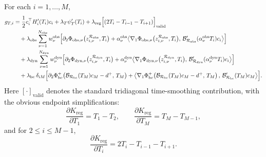 \begin{proposition}
\label{prop:phase10_dKdT}
For each \(i=1,\dots,M\),
\begin{align}
\label{eq:phase10_dKdT}
g_{T,i}
&=
\frac12 c_i^\top H_i'(T_i)c_i
+
\lambda_T \psi_T'(T_i)
+
\lambda_{\mathrm{reg}}
\Bigl[(2T_i-T_{i-1}-T_{i+1})\Bigr]_{\mathrm{valid}}
\notag\\
&\quad
+\lambda_{\mathrm{obs}}
\sum_{\nu=1}^{N_{\mathrm{obs}}}
w_\nu^{\mathrm{obs}}
\Bigl[
\partial_2 \Phi_{\mathrm{obs},\nu}
\bigl(
z_{i,\nu}^{\mathcal R_{\mathrm{obs}}},T_i
\bigr)
+
\alpha_\nu^{\mathrm{obs}}
\bigl\langle
\nabla_1 \Phi_{\mathrm{obs},\nu}
\bigl(
z_{i,\nu}^{\mathcal R_{\mathrm{obs}}},T_i
\bigr),
\,
\mathcal B'_{\mathcal R_{\mathrm{obs}}}(\alpha_\nu^{\mathrm{obs}}T_i)c_i
\bigr\rangle
\Bigr]
\notag\\
&\quad
+\lambda_{\mathrm{dyn}}
\sum_{\nu=1}^{N_{\mathrm{dyn}}}
w_\nu^{\mathrm{dyn}}
\Bigl[
\partial_2 \Phi_{\mathrm{dyn},\nu}
\bigl(
z_{i,\nu}^{\mathcal R_{\mathrm{dyn}}},T_i
\bigr)
+
\alpha_\nu^{\mathrm{dyn}}
\bigl\langle
\nabla_1 \Phi_{\mathrm{dyn},\nu}
\bigl(
z_{i,\nu}^{\mathcal R_{\mathrm{dyn}}},T_i
\bigr),
\,
\mathcal B'_{\mathcal R_{\mathrm{dyn}}}(\alpha_\nu^{\mathrm{dyn}}T_i)c_i
\bigr\rangle
\Bigr]
\notag\\
&\quad
+\lambda_{\mathrm{bc}}\,\delta_{iM}
\Bigl[
\partial_2 \Phi_{\mathrm{bc}}^+
\!\left(
\mathcal B_{\mathcal R_{\mathrm{bc}}}(T_M)c_M-d^+,\,T_M
\right)
+
\bigl\langle
\nabla_1 \Phi_{\mathrm{bc}}^+
\!\left(
\mathcal B_{\mathcal R_{\mathrm{bc}}}(T_M)c_M-d^+,\,T_M
\right),
\,
\mathcal B'_{\mathcal R_{\mathrm{bc}}}(T_M)c_M
\bigr\rangle
\Bigr].
\end{align}
Here \([\cdot]_{\mathrm{valid}}\) denotes the standard tridiagonal time-smoothing contribution, with the obvious endpoint simplifications:
\[
\frac{\partial K_{\mathrm{reg}}}{\partial T_1}=T_1-T_2,
\qquad
\frac{\partial K_{\mathrm{reg}}}{\partial T_M}=T_M-T_{M-1},
\]
and for \(2\le i\le M-1\),
\[
\frac{\partial K_{\mathrm{reg}}}{\partial T_i}=2T_i-T_{i-1}-T_{i+1}.
\]
\end{proposition}

